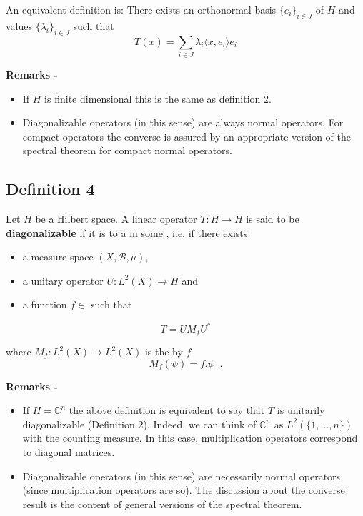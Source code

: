 \documentclass[12pt]{article}
\begin{document}
An equivalent definition is: There exists an orthonormal basis $\{e_i\}_{i \in J}$ of $H$ and values $\{\lambda_i\}_{i \in J}$ such that
\begin{displaymath}
T(x)= \sum_{i \in J} \lambda_i \langle x, e_i \rangle e_i
\end{displaymath}

{\bf Remarks -}
\begin{itemize}
\item If $H$ is finite dimensional this is the same as definition 2.
\item Diagonalizable operators (in this sense) are always normal operators. For compact operators the converse is assured by an appropriate version of the spectral theorem for compact normal operators.
\end{itemize}

\subsection{Definition 4}
Let $H$ be a Hilbert space. A linear operator $T:H\longrightarrow H$ is said to be {\bf diagonalizable} if it is  to a  in some , i.e. if there exists

\begin{itemize}
\item a measure space $(X, \mathcal{B}, \mu)$,
\item a unitary operator $U: L^2(X) \longrightarrow H$ and
\item a function $f \in$  such that
\end{itemize}

\begin{displaymath}
T=U M_f U^*
\end{displaymath}

where $M_f: L^2(X) \longrightarrow L^2(X)$ is the  by $f$
\begin{displaymath}
M_f(\psi) = f .\psi \;\;.
\end{displaymath}

{\bf Remarks -}
\begin{itemize}
\item If $H = \mathbb{C}^n$ the above definition is equivalent to say that $T$ is unitarily diagonalizable (Definition 2). Indeed, we can think of $\mathbb{C}^n$ as $L^2(\{1, \dots, n\})$ with the counting measure. In this case, multiplication operators correspond to diagonal matrices.
\item Diagonalizable operators (in this sense) are necessarily normal operators (since multiplication operators are so). The discussion about the converse result is the content of general versions of the spectral theorem.
\end{itemize}
\end{document}

